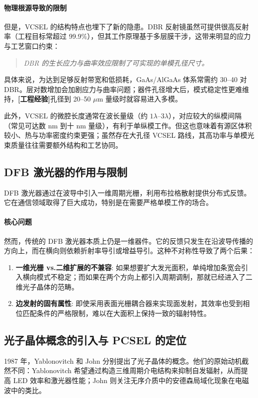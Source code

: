 \paragraph{物理根源导致的限制}但是，VCSEL 的结构特点也埋下了新的隐患。DBR 反射镜虽然可提供很高反射率（工程目标常超过 99.9\%），但其工作原理基于多层膜干涉，这带来明显的应力与工艺窗口约束\cite{coldren2012}：
\begin{quote}
\textit{DBR 的生长应力与曲率效应限制了可实现的单模孔径尺寸。}
\end{quote}
具体来说，为达到足够反射带宽和低损耗，GaAs/AlGaAs 体系常需约 30--40 对 DBR\cite{coldren2012}。层对数增加会加剧应力与曲率问题；器件孔径增大后，模式稳定性更难维持，\textbf{[工程经验]}孔径到 20--50 $\mu$m 量级时就容易进入多模。

此外，VCSEL 的微腔长度通常在波长量级（约 $1\lambda$--$3\lambda$），对应较大的纵模间隔（常见可达数 nm 到十 nm 量级），有利于单纵模工作\cite{coldren2012}。但这也意味着有源区体积较小、热与功率密度约束更强；虽然存在大孔径 VCSEL 路线，其高功率与单模光束质量往往需要额外结构和工艺协同\cite{sarzala2010oxideproton}。

\subsection{DFB 激光器的作用与限制}
DFB 激光器通过在波导中引入一维周期光栅，利用布拉格散射提供分布式反馈。它在通信领域取得了巨大成功，特别是在需要严格单模工作的场合。

\paragraph{核心问题} 然而，传统的 DFB 激光器本质上仍是一维器件。它的反馈只发生在沿波导传播的方向上，而在横向则依赖折射率导引或增益导引。这种不对称性导致了两个后果：
\begin{enumerate}
  \item \textbf{一维光栅 vs.二维扩展的不兼容}: 如果想要扩大发光面积，单纯增加条宽会引入横向模式不稳定；而如果在两个方向上都引入周期调制，那就已经进入了二维光子晶体的范畴。
  \item \textbf{边发射的固有属性}: 即使采用表面光栅耦合器来实现面发射，其效率也受到相位匹配条件的严格限制，难以在大面积上保持一致的辐射特性。
\end{enumerate}

\subsection{光子晶体概念的引入与 PCSEL 的定位}
1987 年，Yablonovitch 和 John 分别提出了光子晶体的概念。他们的原始动机截然不同：Yablonovitch 希望通过构造三维周期介电结构来抑制自发辐射，从而提高 LED 效率和激光器性能；John 则关注无序介质中的安德森局域化现象在电磁波中的类比。

